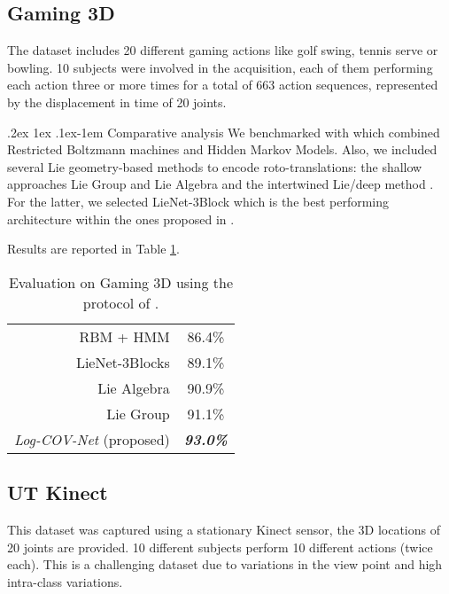 \documentclass[10pt,twocolumn]{article}
\makeatletter
\renewcommand{\paragraph}{%
	\@startsection{paragraph}{4}%
	{\z@}{.2ex \@plus 1ex \@minus .1ex}{-1em}%
	{\normalfont\normalsize\bfseries}%
}
\makeatother
\begin{document}
\subsection{Gaming 3D}

The dataset includes 20 different gaming actions like \textsf{golf swing}, \textsf{tennis serve} or \textsf{bowling}. 10 subjects were involved in the acquisition, each of them performing each action three or more times for a total of 663 action sequences, represented by the displacement in time of 20 joints.

\paragraph{Comparative analysis} We benchmarked with \cite{RBMHMM} which combined Restricted Boltzmann machines and Hidden Markov Models. Also, we included several Lie geometry-based methods to encode roto-translations: the shallow approaches Lie Group \cite{Vemulapalli:CVPR14} and Lie Algebra \cite{Vemulapalli:CVPR16} and the intertwined Lie/deep method \cite{deeplie}. For the latter, we selected LieNet-3Block which is the best performing architecture within the ones proposed in \cite{deeplie}.

Results are reported in Table \ref{tab:G3D}.

\begin{table}[h!]
	\centering
	\begin{tabular}{|rc|}
	\hline
	RBM + HMM \cite{RBMHMM} & 86.4\% \\
	LieNet-3Blocks \cite{deeplie} & 89.1\% \\
	Lie Algebra \cite{Vemulapalli:CVPR16} & 90.9\% \\
	Lie Group \cite{Vemulapalli:CVPR14} & 91.1\% \\ \hline \hline
	\textit{Log-COV-Net} (proposed) & \textbf{\textit{93.0\%}} \\ \hline
\end{tabular}\vspace{5pt}
\caption{Evaluation on Gaming 3D using the protocol of \cite{Vemulapalli:CVPR16}.}
\label{tab:G3D}
\end{table}


\subsection{UT Kinect}

This dataset was captured using a stationary Kinect sensor, the 3D locations of 20 joints are provided. 10 different subjects perform 10 different actions (twice each). This is a challenging dataset due to variations in the view point and high intra-class variations.
\end{document}
